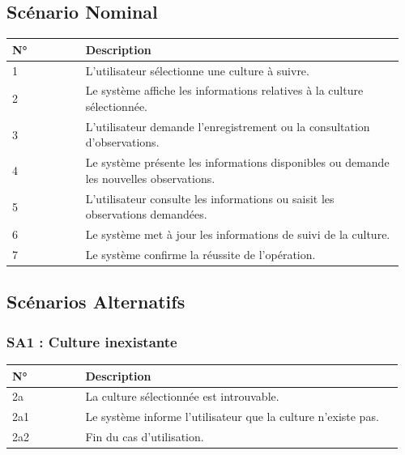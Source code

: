 \hypertarget{scuxe9nario-nominal-2}{%
\subsection{Scénario Nominal}\label{scuxe9nario-nominal-2}}

\begin{longtable}{@{}p{0.18\linewidth}p{0.78\linewidth}@{}}
\toprule
\rowcolors{2}{gray!10}{white}
\textbf{N°} & \textbf{Description} \\
\midrule
\endhead
1 & L'utilisateur sélectionne une culture à suivre. \\
2 & Le système affiche les informations relatives à la culture
sélectionnée. \\
3 & L'utilisateur demande l'enregistrement ou la consultation
d'observations. \\
4 & Le système présente les informations disponibles ou demande les
nouvelles observations. \\
5 & L'utilisateur consulte les informations ou saisit les observations
demandées. \\
6 & Le système met à jour les informations de suivi de la culture. \\
7 & Le système confirme la réussite de l'opération. \\
\bottomrule
\end{longtable}

\hypertarget{scuxe9narios-alternatifs-2}{%
\subsection{Scénarios Alternatifs}\label{scuxe9narios-alternatifs-2}}

\hypertarget{sa1-culture-inexistante}{%
\subsubsection{SA1 : Culture
inexistante}\label{sa1-culture-inexistante}}

\begin{longtable}{@{}p{0.18\linewidth}p{0.78\linewidth}@{}}
\toprule
\rowcolors{2}{gray!10}{white}
\textbf{N°} & \textbf{Description} \\
\midrule
\endhead
2a & La culture sélectionnée est introuvable. \\
2a1 & Le système informe l'utilisateur que la culture n'existe pas. \\
2a2 & Fin du cas d'utilisation. \\
\bottomrule
\end{longtable}

